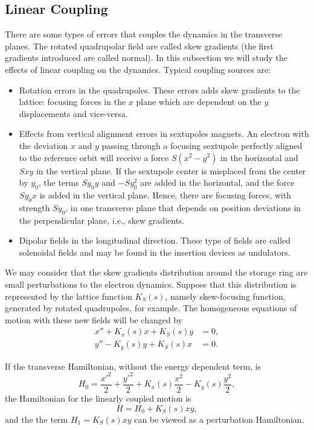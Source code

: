 \subsection{Linear Coupling}\label{subsec:linear_coupling}
There are some types of errors that couples the dynamics in the transverse planes. The rotated quadrupolar field are called skew gradients (the first gradients introduced are called normal). In this subsection we will study the effects of linear coupling on the dynamics. Typical coupling sources are:
\begin{itemize}
    \item Rotation errors in the quadrupoles. These errors adds skew gradients to the lattice: focusing forces in the $x$ plane which are dependent on the $y$ displacements and vice-versa.
    \item Effects from vertical alignment errors in sextupoles magnets. An electron with the deviation $x$ and $y$ passing through a focusing sextupole perfectly aligned to the reference orbit will receive a force $S(x^2-y^2)$ in the horizontal and $Sxy$ in the vertical plane. If the sextupole center is misplaced from the center by $y_0$, the terms $Sy_0 y$ and $-Sy_0^2$ are added in the horizontal, and the force $Sy_0 x$ is added in the vertical plane. Hence, there are focusing forces, with strength $Sy_0$, in one transverse plane that depends on position deviations in the perpendicular plane, i.e., skew gradients.
    \item Dipolar fields in the longitudinal direction. These type of fields are called solenoidal fields and may be found in the insertion devices as undulators.
\end{itemize}

We may consider that the skew gradients distribution around the storage ring are small perturbations to the electron dynamics. Suppose that this distribution is represented by the lattice function $K_S(s)$, namely skew-focusing function, generated by rotated quadrupoles, for example. The homogeneous equations of motion with these new fields will be changed by
\begin{align}
    x'' + K_x(s) x + K_S(s)y &=0, \\
    y'' - K_y(s) y + K_S(s)x &=0.
\end{align}

If the transverse Hamiltonian, without the energy dependent term, is 
\begin{equation*}
H_0 = \dfrac{{x'}^2}{2} + \dfrac{{y'}^2}{2} + K_x(s)\dfrac{{x}^2}{2} - K_y(s) \frac{y^2}{2},    
\end{equation*}
the Hamiltonian for the linearly coupled motion is 
\begin{equation*}
    H = H_0 + K_S(s) xy,
\end{equation*}
and the the term $H_1 = K_S(s) xy$ can be viewed as a perturbation Hamiltonian.

